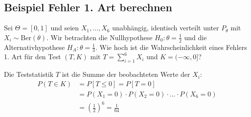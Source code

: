 \subsection{Beispiel Fehler 1. Art berechnen}
Sei $\Theta = [0, 1]$ und seien $X_1, \ldots , X_6$ unabhängig, identisch verteilt unter $P_\theta$
mit $X_i \sim \text{Ber}(\theta)$. Wir betrachten die Nullhypothese $H_0 : \theta = \frac{1}{2}$ und die Alternativhypothese
$H_A : \theta = \frac{1}{3}$. Wie hoch ist die Wahrscheinlichkeit eines Fehlers 1. Art für den Test $(T, K)$ mit
$T = \sum_{i=1}^{6} X_i$ und $K = (-\infty, 0]$?

Die Teststatistik $T$ ist die Summe der beobachteten Werte der $X_i$:
\begin{align*}
  P(T \in K)  &= P[T \leq 0] = P[T = 0] \\
              &= P(X_1 = 0) \cdot P(X_2 = 0) \cdot \ldots \cdot P(X_6 = 0)\\
              &= \left( \frac{1}{2} \right)^6 = \frac{1}{64} 
\end{align*}



\BoxEnd{}
\BoxStart{}
